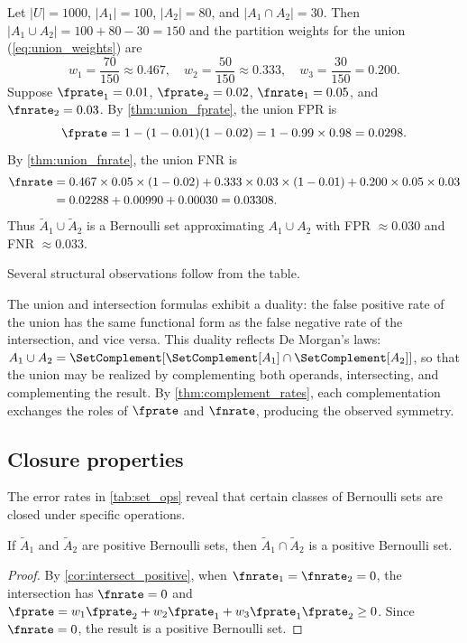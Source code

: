 \begin{example}
\label{ex:numerical_union}
Let $|U| = 1000$, $|A_1| = 100$, $|A_2| = 80$, and $|A_1 \cap A_2| = 30$.
Then $|A_1 \cup A_2| = 100 + 80 - 30 = 150$ and the partition weights for the union (\cref{eq:union_weights}) are
\begin{equation}
w_1 = \frac{70}{150} \approx 0.467, \quad
w_2 = \frac{50}{150} \approx 0.333, \quad
w_3 = \frac{30}{150} = 0.200.
\end{equation}
Suppose $\fprate_1 = 0.01$, $\fprate_2 = 0.02$, $\fnrate_1 = 0.05$, and $\fnrate_2 = 0.03$.
By \cref{thm:union_fprate}, the union FPR is
\begin{equation}
\fprate = 1 - (1 - 0.01)(1 - 0.02) = 1 - 0.99 \times 0.98 = 0.0298.
\end{equation}
By \cref{thm:union_fnrate}, the union FNR is
\begin{align}
\fnrate &= 0.467 \times 0.05 \times (1 - 0.02)
         + 0.333 \times 0.03 \times (1 - 0.01)
         + 0.200 \times 0.05 \times 0.03 \notag \\
       &= 0.02288 + 0.00990 + 0.00030 = 0.03308.
\end{align}
Thus $\tilde{A}_1 \cup \tilde{A}_2$ is a Bernoulli set approximating $A_1 \cup A_2$ with FPR $\approx 0.030$ and FNR $\approx 0.033$.
\end{example}

Several structural observations follow from the table.

The union and intersection formulas exhibit a duality:
the false positive rate of the union has the same functional form as the
false negative rate of the intersection, and vice versa.
This duality reflects De Morgan's laws: $A_1 \cup A_2 =
\SetComplement[\SetComplement[A_1] \cap \SetComplement[A_2]]$, so that
the union may be realized by complementing both operands, intersecting,
and complementing the result.
By \cref{thm:complement_rates}, each complementation exchanges the roles
of $\fprate$ and $\fnrate$, producing the observed symmetry.

\subsection{Closure properties}
\label{sec:closure}
The error rates in \cref{tab:set_ops} reveal that certain classes of
Bernoulli sets are closed under specific operations.

\begin{theorem}
\label{thm:closure_positive_intersect}
If $\tilde{A}_1$ and $\tilde{A}_2$ are positive Bernoulli sets, then
$\tilde{A}_1 \cap \tilde{A}_2$ is a positive Bernoulli set.
\end{theorem}
\begin{proof}
By \cref{cor:intersect_positive}, when $\fnrate_1 = \fnrate_2 = 0$,
the intersection has $\fnrate = 0$ and
$\fprate = w_1 \fprate_2 + w_2 \fprate_1
+ w_3 \fprate_1 \fprate_2 \geq 0$.
Since $\fnrate = 0$, the result is a positive Bernoulli set.
\end{proof}

